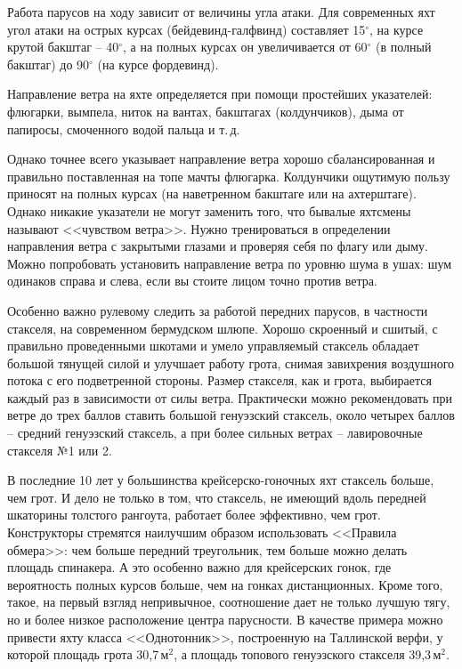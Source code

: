 \documentclass[a4paper, 12pt, twoside, final]{scrbook}
\begin{document}
Работа парусов на ходу зависит от величины угла атаки. Для современных яхт угол атаки на острых курсах (бейдевинд\--галфвинд) составляет 15$^\circ$, на курсе крутой бакштаг \--- 40$^\circ$, а на полных курсах он увеличивается от 60$^\circ$ (в полный бакштаг) до 90$^\circ$ (на курсе фордевинд).

Направление ветра на яхте определяется при помощи простейших указателей: флюгарки, вымпела, ниток на вантах, бакштагах (колдунчиков), дыма от папиросы, смоченного водой пальца и т.\,д.

Однако точнее всего указывает направление ветра хорошо сбалансированная и правильно поставленная на топе мачты флюгарка. Колдунчики ощутимую пользу приносят на полных курсах (на наветренном бакштаге или на ахтерштаге). Однако никакие указатели не могут заменить того, что бывалые яхтсмены называют <<чувством ветра>>. Нужно тренироваться в определении направления ветра с закрытыми глазами и проверяя себя по флагу или дыму. Можно попробовать установить направление ветра по уровню шума в ушах: шум одинаков справа и слева, если вы стоите лицом точно против ветра.

Особенно важно рулевому следить за работой передних парусов, в частности стакселя, на современном бермудском шлюпе. Хорошо скроенный и сшитый, с правильно проведенными шкотами и умело управляемый стаксель обладает большой тянущей силой и улучшает работу грота, снимая завихрения воздушного потока с его подветренной стороны. Размер стакселя, как и грота, выбирается каждый раз в зависимости от силы ветра. Практически можно рекомендовать при ветре до трех баллов ставить большой генуэзский стаксель, около четырех баллов \--- средний генуэзский стаксель, а при более сильных ветрах \--- лавировочные стакселя №1 или 2.

В последние 10 лет у большинства крейсерско-гоночных яхт стаксель больше, чем грот. И дело не только в том, что стаксель, не имеющий вдоль передней шкаторины толстого рангоута, работает более эффективно, чем грот. Конструкторы стремятся наилучшим образом использовать <<Правила обмера>>: чем больше передний треугольник, тем больше можно делать площадь спинакера. А это особенно важно для крейсерских гонок, где вероятность полных курсов больше, чем на гонках дистанционных. Кроме того, такое, на первый взгляд непривычное, соотношение дает не только лучшую тягу, но и более низкое расположение центра парусности. В качестве примера можно привести яхту класса <<Однотонник>>, построенную на Таллинской верфи, у которой площадь грота 30,7\,м$^2$, а площадь топового генуэзского стакселя 39,3\,м$^2$. 
\end{document}
